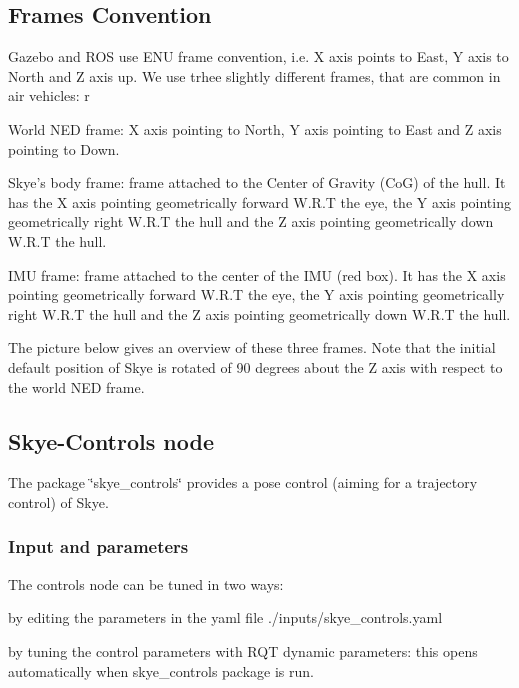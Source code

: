 {\ttfamily \subsection*{Frames Convention}}

{\ttfamily  Gazebo and R\-O\-S use E\-N\-U frame convention, i.\-e. X axis points to East, Y axis to North and Z axis up. We use trhee slightly different frames, that are common in air vehicles\-: r}

{\ttfamily 
\begin{DoxyItemize}
\item World N\-E\-D frame\-: X axis pointing to North, Y axis pointing to East and Z axis pointing to Down.
\item Skye's body frame\-: frame attached to the Center of Gravity (Co\-G) of the hull. It has the X axis pointing geometrically forward W.\-R.\-T the eye, the Y axis pointing geometrically right W.\-R.\-T the hull and the Z axis pointing geometrically down W.\-R.\-T the hull.
\item I\-M\-U frame\-: frame attached to the center of the I\-M\-U (red box). It has the X axis pointing geometrically forward W.\-R.\-T the eye, the Y axis pointing geometrically right W.\-R.\-T the hull and the Z axis pointing geometrically down W.\-R.\-T the hull.
\end{DoxyItemize}}

{\ttfamily The picture below gives an overview of these three frames. Note that the initial default position of Skye is rotated of 90 degrees about the Z axis with respect to the world N\-E\-D frame.}

{\ttfamily }

{\ttfamily   }

{\ttfamily }

{\ttfamily \subsection*{Skye-\/\-Controls node}}

{\ttfamily  The package \char`\"{}skye\-\_\-controls\char`\"{} provides a pose control (aiming for a trajectory control) of Skye.}

{\ttfamily \subsubsection*{Input and parameters}}

{\ttfamily  The controls node can be tuned in two ways\-:
\begin{DoxyItemize}
\item by editing the parameters in the yaml file ./inputs/skye\-\_\-controls.yaml
\item by tuning the control parameters with R\-Q\-T dynamic parameters\-: this opens automatically when skye\-\_\-controls package is run.
\end{DoxyItemize}}

